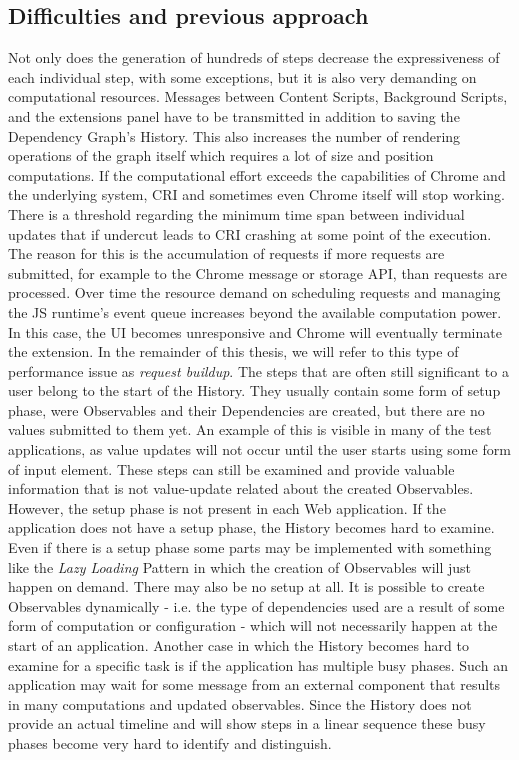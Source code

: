 \subsection{Difficulties and previous approach}
Not only does the generation of hundreds of steps decrease the expressiveness of each individual step, with some exceptions, but it is also very demanding on computational resources. Messages between Content Scripts, Background Scripts, and the extensions panel have to be transmitted in addition to saving the Dependency Graph's History. This also increases the number of rendering operations of the graph itself which requires a lot of size and position computations. If the computational effort exceeds the capabilities of Chrome and the underlying system, CRI and sometimes even Chrome itself will stop working. There is a threshold regarding the minimum time span between individual updates that if undercut leads to CRI crashing at some point of the execution. The reason for this is the accumulation of requests if more requests are submitted, for example to the Chrome message or storage API, than requests are processed. Over time the resource demand on scheduling requests and managing the JS runtime's event queue increases beyond the available computation power. In this case, the UI becomes unresponsive and Chrome will eventually terminate the extension. In the remainder of this thesis, we will refer to this type of performance issue as \emph{request buildup}.
The steps that are often still significant to a user belong to the start of the History. They usually contain some form of setup phase, were Observables and their Dependencies are created, but there are no values submitted to them yet. An example of this is visible in many of the test applications, as value updates will not occur until the user starts using some form of input element.
 These steps can still be examined and provide valuable information that is not value-update related about the created Observables. However, the setup phase is not present in each Web application. If the application does not have a setup phase, the History becomes hard to examine. Even if there is a setup phase some parts may be implemented with something like the \emph{Lazy Loading} Pattern \cite{Lazy} in which the creation of Observables will just happen on demand. There may also be no setup at all. It is possible to create Observables dynamically - i.e. the type of dependencies used are a result of some form of computation or configuration - which will not necessarily happen at the start of an application. Another case in which the History becomes hard to examine for a specific task is if the application has multiple busy phases. Such an application may wait for some message from an external component that results in many computations and updated observables. Since the History does not provide an actual timeline and will show steps in a linear sequence these busy phases become very hard to identify and distinguish. 
